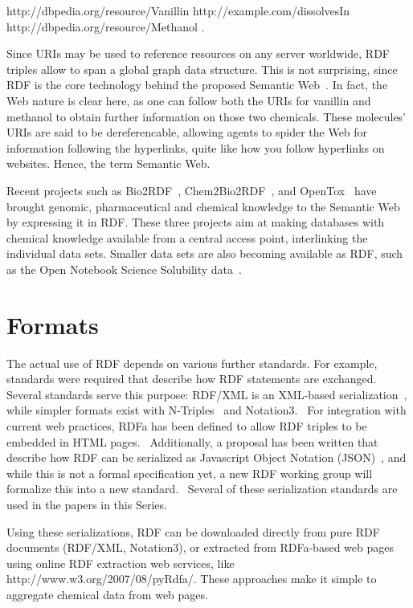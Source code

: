 \documentclass[10pt]{bmc_article}
\newenvironment{bmcformat}{\begin{raggedright}\baselineskip20pt\sloppy\setboolean{publ}{false}}{\end{raggedright}\baselineskip20pt\sloppy}
\begin{document}
\begin{bmcformat}
http://dbpedia.org/resource/Vanillin http://example.com/dissolvesIn http://dbpedia.org/resource/Methanol .

Since URIs may be used to reference resources on any server worldwide,
RDF triples allow to span a global graph data structure. 
This is not surprising, since RDF is the core technology behind the
proposed Semantic Web~\cite{BER2001}. In fact, the Web
nature is clear here, as one can follow both the URIs for vanillin and methanol to
obtain further information on those two chemicals. These molecules' URIs are said to be
dereferencable, allowing agents to spider the Web for information following
the hyperlinks, quite like how you follow hyperlinks on websites. Hence, the term Semantic Web.

Recent projects such as Bio2RDF~\cite{BEL2008}, Chem2Bio2RDF~\cite{CHE2010},
and OpenTox~\cite{Hardy2010} have brought genomic, pharmaceutical and
chemical knowledge to the Semantic Web by expressing it in RDF.
These three projects aim at making databases with chemical knowledge
available from a central access point, interlinking the individual
data sets. Smaller data sets are also becoming available as RDF, such as
the Open Notebook Science Solubility data~\cite{citeulike:5441072}. 

\section{Formats}

The actual use of RDF depends on various further standards. For example, standards were required
that describe how RDF statements are exchanged. Several standards
serve this purpose: RDF/XML is an XML-based serialization~\cite{Beckett2004}, while
simpler formats exist with N-Triples~\cite{Beckett2004b} and Notation3.~\cite{BernersLee2006} For integration with
current web practices, RDFa has been defined to allow RDF triples to be embedded
in HTML pages.~\cite{RDFA2008} Additionally, a proposal has been written that
describe how RDF can be serialized as Javascript Object Notation (JSON)~\cite{Alexander2008}, and
while this is not a formal specification yet,
a new RDF working group will formalize this into a new standard.~\cite{Herman2010} Several
of these serialization standards are used in the papers in this Series.

Using these serializations, RDF can be downloaded directly from pure RDF
documents (RDF/XML, Notation3), or extracted from RDFa-based web pages using
online RDF extraction web services, like http://www.w3.org/2007/08/pyRdfa/.
These approaches make it simple to aggregate chemical data from web pages.


\end{bmcformat}
\end{document}
